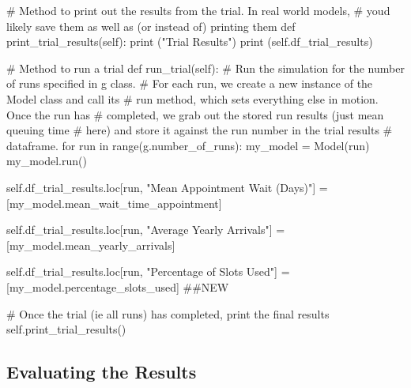 \documentclass[
  letterpaper,
  DIV=11,
  numbers=noendperiod]{scrreprt}
\newenvironment{Shaded}{\begin{snugshade}}{\end{snugshade}}
\newcommand{\BuiltInTok}[1]{\textcolor[rgb]{0.00,0.23,0.31}{#1}}
\newcommand{\CommentTok}[1]{\textcolor[rgb]{0.37,0.37,0.37}{#1}}
\newcommand{\ControlFlowTok}[1]{\textcolor[rgb]{0.00,0.23,0.31}{#1}}
\newcommand{\KeywordTok}[1]{\textcolor[rgb]{0.00,0.23,0.31}{#1}}
\newcommand{\NormalTok}[1]{\textcolor[rgb]{0.00,0.23,0.31}{#1}}
\newcommand{\OperatorTok}[1]{\textcolor[rgb]{0.37,0.37,0.37}{#1}}
\newcommand{\StringTok}[1]{\textcolor[rgb]{0.13,0.47,0.30}{#1}}
\newcommand{\VariableTok}[1]{\textcolor[rgb]{0.07,0.07,0.07}{#1}}
\begin{document}
\begin{Shaded}
\begin{Highlighting}[]
    \CommentTok{\# Method to print out the results from the trial.  In real world models,}
    \CommentTok{\# you\textquotesingle{}d likely save them as well as (or instead of) printing them}
    \KeywordTok{def}\NormalTok{ print\_trial\_results(}\VariableTok{self}\NormalTok{):}
        \BuiltInTok{print}\NormalTok{ (}\StringTok{"Trial Results"}\NormalTok{)}
        \BuiltInTok{print}\NormalTok{ (}\VariableTok{self}\NormalTok{.df\_trial\_results)}

    \CommentTok{\# Method to run a trial}
    \KeywordTok{def}\NormalTok{ run\_trial(}\VariableTok{self}\NormalTok{):}
        \CommentTok{\# Run the simulation for the number of runs specified in g class.}
        \CommentTok{\# For each run, we create a new instance of the Model class and call its}
        \CommentTok{\# run method, which sets everything else in motion.  Once the run has}
        \CommentTok{\# completed, we grab out the stored run results (just mean queuing time}
        \CommentTok{\# here) and store it against the run number in the trial results}
        \CommentTok{\# dataframe.}
        \ControlFlowTok{for}\NormalTok{ run }\KeywordTok{in} \BuiltInTok{range}\NormalTok{(g.number\_of\_runs):}
\NormalTok{            my\_model }\OperatorTok{=}\NormalTok{ Model(run)}
\NormalTok{            my\_model.run()}

            \VariableTok{self}\NormalTok{.df\_trial\_results.loc[run, }\StringTok{"Mean Appointment Wait (Days)"}\NormalTok{] }\OperatorTok{=}\NormalTok{ [my\_model.mean\_wait\_time\_appointment]}

            \VariableTok{self}\NormalTok{.df\_trial\_results.loc[run, }\StringTok{"Average Yearly Arrivals"}\NormalTok{] }\OperatorTok{=}\NormalTok{ [my\_model.mean\_yearly\_arrivals]}

            \VariableTok{self}\NormalTok{.df\_trial\_results.loc[run, }\StringTok{"Percentage of Slots Used"}\NormalTok{] }\OperatorTok{=}\NormalTok{ [my\_model.percentage\_slots\_used] }\CommentTok{\#\#NEW}

        \CommentTok{\# Once the trial (ie all runs) has completed, print the final results}
        \VariableTok{self}\NormalTok{.print\_trial\_results()}
\end{Highlighting}
\end{Shaded}

\subsection{Evaluating the Results}\label{evaluating-the-results-1}
\end{document}
